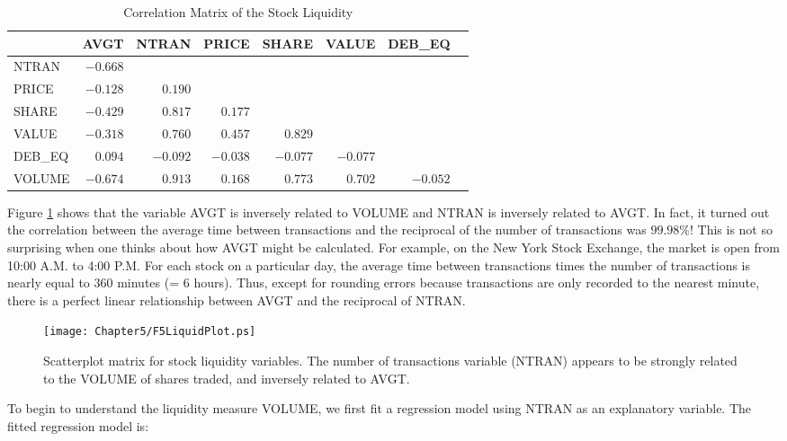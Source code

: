 \begin{table}[h]

\caption{\label{T5:LiquidCorr} Correlation Matrix of the Stock
Liquidity}
\begin{tabular}{lrrrrrrr}
\hline & AVGT & NTRAN & PRICE & SHARE & VALUE & DEB\_EQ \\ \hline
\multicolumn{1}{l}{NTRAN} & $-0.668$ &  &  &  &  &  \\
\multicolumn{1}{l}{PRICE} & $-0.128$ & $0.190$ &  &  &  &  \\
\multicolumn{1}{l}{SHARE} & $-0.429$ & $0.817$ & $0.177$ &  &  &  \\
\multicolumn{1}{l}{VALUE} & $-0.318$ & $0.760$ & $0.457$ & $0.829$ &  &  \\
\multicolumn{1}{l}{DEB\_EQ} & $0.094$ & $-0.092$ & $-0.038$ & $-0.077$ & $%
-0.077$ &  \\
\multicolumn{1}{l}{VOLUME} & $-0.674$ & $0.913$ & $0.168$ & $0.773$ & $0.702$
& $-0.052$ \\ \hline
\end{tabular}
\end{table}

Figure \ref{F5:LiquidPlot} shows that the variable AVGT is inversely
related to VOLUME and NTRAN is inversely related to AVGT. In fact,
it turned out the correlation between the average time between
transactions and the reciprocal of the number of transactions was
$99.98\%$! This is not so surprising when one thinks about how AVGT
might be calculated. For example, on the New York Stock Exchange,
the market is open from 10:00 A.M. to 4:00 P.M. For each stock on a
particular day, the average time between transactions times the
number of transactions is nearly equal to 360 minutes (= 6 hours).
Thus, except for rounding errors because transactions are only
recorded to the nearest minute, there is a perfect linear
relationship between AVGT and the reciprocal of NTRAN.


\begin{figure}[htp]
  \begin{center}
    \texttt{[image: Chapter5/F5LiquidPlot.ps]}
    \caption{\label{F5:LiquidPlot} \small  Scatterplot matrix for
stock liquidity variables. The number of transactions variable
(NTRAN) appears to be strongly related to the VOLUME of shares
traded, and inversely related to AVGT.}
  \end{center}
\end{figure}


To begin to understand the liquidity measure VOLUME, we first fit a
regression model using NTRAN as an explanatory variable. The fitted
regression model is:

